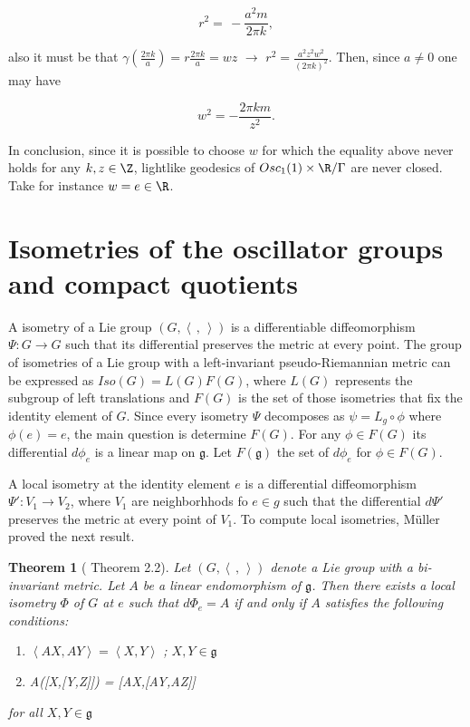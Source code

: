 \documentclass[11pt]{amsart}
\newcommand{\lela}{\left \langle}
\newcommand{\rira}{\right \rangle}
\newcommand{\mgg}{\mathfrak g }
\theoremstyle{plain}
\newtheorem{thm}{Theorem}[section]
\theoremstyle{definition}
\theoremstyle{remark}
\begin{document}
	\begin{equation*}
		r^2 = \, - \frac{a^2 m}{2 \pi k},
	\end{equation*}
	
	also it must be that $\gamma(\frac{2 \pi k}{a}) = r \frac{2 \pi k}{a} = w z$ $\rightarrow$ $r^2 = \frac{a^2 z^2 w^2}{(2 \pi k)^2}$. Then,  since $a \neq 0$ one may have
	
	\begin{equation*}
		w^2 = -\frac{2 \pi k m}{z^2}.
	\end{equation*}
	
	In conclusion, since it is possible to choose $w$ for which the equality above never holds  for any $k,z \in \Z$, lightlike geodesics of $Osc_1(1) \times \R/\Gamma$ are never closed. Take for instance  $w = e\in \R$. 
	
	
	
	
	\section{Isometries of the oscillator groups and compact quotients}
A isometry of  a Lie group $(G, \lela\,,\,\rira)$ is a differentiable diffeomorphism $\Psi:G \to G$ such that its differential preserves the metric at every point.  
    The group of isometries of a Lie group with a left-invariant pseudo-Riemannian  metric can be expressed as $Iso(G) = L(G)F(G)$, where $L(G)$ represents the subgroup of left translations and $F(G)$ is the set of  those isometries that fix the identity element of $G$.  Since every isometry $\Psi$ decomposes as $\psi = L_g \circ \phi$ where $\phi(e)=e$, the main question is determine $F(G)$. For any $\phi\in F(G)$ its differential $d\phi_e$ is a linear map on $\mathfrak g$. Let $F(\mathfrak g)$ the set of $d\phi_e$ for  $\phi \in F(G)$.
    
    
    A local isometry  at the identity element  $e$ is a differential diffeomorphism $\Psi':V_1 \to V_2$, where $V_1$ are neighborhhods fo $e\in g$ such that the differential $d\Psi'$ preserves the metric at every point of $V_1$.  To compute local isometries, M\"uller proved the next result.

    \begin{thm}[\cite{MU} Theorem 2.2] 
    Let $(G, \lela\,,\,\rira)$ denote a Lie group with a bi-invariant metric.     Let $A$ be a linear endomorphism of $\mgg$. Then there exists a local isometry $\Phi$ of $G$ at $e$ such that $d \Phi_e = A$ if and only if $A$ satisfies the following conditions:
        \begin{enumerate}
            \item $\lela AX, AY \rira = \lela X, Y \rira$ ; $X,Y \in \mgg$
            \item A([X,[Y,Z]]) = [AX,[AY,AZ]]
        \end{enumerate}
        for all $X,Y \in \mgg$
    \end{thm}
\end{document}
